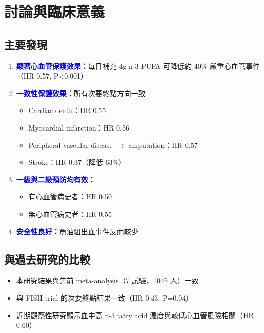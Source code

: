 \documentclass[12pt,a4paper]{article}
\begin{document}
\section{討論與臨床意義}

\subsection{主要發現}

\begin{enumerate}
    \item \textcolor{blue}{\textbf{顯著心血管保護效果：}}每日補充 4g n-3 PUFA 可降低約 40\% 嚴重心血管事件（HR 0.57, P<0.001）

    \item \textcolor{blue}{\textbf{一致性保護效果：}}所有次要終點方向一致
    \begin{itemize}
        \item Cardiac death：HR 0.55
        \item Myocardial infarction：HR 0.56
        \item Peripheral vascular disease $\rightarrow$ amputation：HR 0.57
        \item Stroke：HR 0.37（降低 63\%）
    \end{itemize}

    \item \textcolor{blue}{\textbf{一級與二級預防均有效：}}
    \begin{itemize}
        \item 有心血管病史者：HR 0.50
        \item 無心血管病史者：HR 0.55
    \end{itemize}

    \item \textcolor{blue}{\textbf{安全性良好：}}魚油組出血事件反而較少
\end{enumerate}

\subsection{與過去研究的比較}

\begin{itemize}
    \item 本研究結果與先前 meta-analysis（7 試驗、1045 人）一致
    \item 與 FISH trial 的次要終點結果一致（HR 0.43, P=0.04）
    \item 近期觀察性研究顯示血中高 n-3 fatty acid 濃度與較低心血管風險相關（HR 0.60）
\end{itemize}
\end{document}
